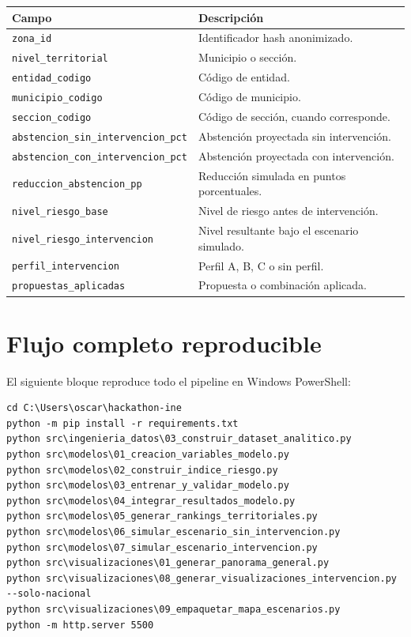 \documentclass[11pt,a4paper]{article}
\begin{document}
\begin{longtable}{p{}p{}}
\toprule
\textbf{Campo} & \textbf{Descripción}\\
\midrule
\texttt{zona\_id} & Identificador hash anonimizado.\\
\texttt{nivel\_territorial} & Municipio o sección.\\
\texttt{entidad\_codigo} & Código de entidad.\\
\texttt{municipio\_codigo} & Código de municipio.\\
\texttt{seccion\_codigo} & Código de sección, cuando corresponde.\\
\texttt{abstencion\_sin\_intervencion\_pct} & Abstención proyectada sin intervención.\\
\texttt{abstencion\_con\_intervencion\_pct} & Abstención proyectada con intervención.\\
\texttt{reduccion\_abstencion\_pp} & Reducción simulada en puntos porcentuales.\\
\texttt{nivel\_riesgo\_base} & Nivel de riesgo antes de intervención.\\
\texttt{nivel\_riesgo\_intervencion} & Nivel resultante bajo el escenario simulado.\\
\texttt{perfil\_intervencion} & Perfil A, B, C o sin perfil.\\
\texttt{propuestas\_aplicadas} & Propuesta o combinación aplicada.\\
\bottomrule
\end{longtable}

\section{Flujo completo reproducible}

El siguiente bloque reproduce todo el pipeline en Windows PowerShell:

\begin{lstlisting}[style=terminal]
cd C:\Users\oscar\hackathon-ine
python -m pip install -r requirements.txt
python src\ingenieria_datos\03_construir_dataset_analitico.py
python src\modelos\01_creacion_variables_modelo.py
python src\modelos\02_construir_indice_riesgo.py
python src\modelos\03_entrenar_y_validar_modelo.py
python src\modelos\04_integrar_resultados_modelo.py
python src\modelos\05_generar_rankings_territoriales.py
python src\modelos\06_simular_escenario_sin_intervencion.py
python src\modelos\07_simular_escenario_intervencion.py
python src\visualizaciones\01_generar_panorama_general.py
python src\visualizaciones\08_generar_visualizaciones_intervencion.py --solo-nacional
python src\visualizaciones\09_empaquetar_mapa_escenarios.py
python -m http.server 5500
\end{lstlisting}
\end{document}
